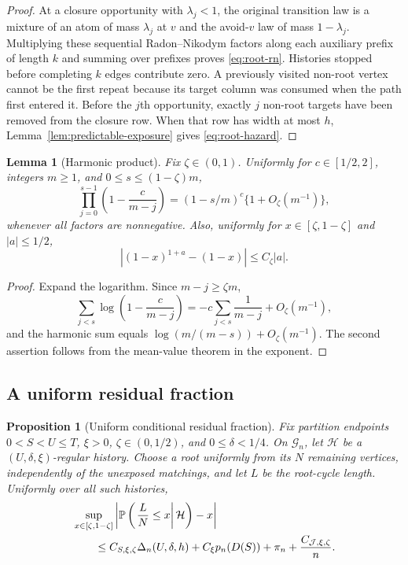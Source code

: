 \documentclass[11pt]{article}
\newtheorem{proposition}[theorem]{Proposition}
\newtheorem{lemma}[theorem]{Lemma}
\theoremstyle{definition}
\theoremstyle{remark}
\newcommand{\Pp}{\mathbb P}
\newcommand{\cH}{\mathcal H}
\newcommand{\cG}{\mathcal G}
\newcommand{\cJ}{\mathcal J}
\begin{document}
\begin{proof}
At a closure opportunity with $\lambda_j<1$, the original transition law is a
mixture of an atom of mass $\lambda_j$ at $v$ and the avoid-$v$ law of mass
$1-\lambda_j$.  Multiplying these sequential Radon--Nikodym factors along
each auxiliary prefix of length $k$ and summing over prefixes proves
\eqref{eq:root-rn}.  Histories stopped before completing $k$ edges contribute
zero.  A previously visited non-root vertex cannot be the first repeat because
its target column was consumed when the path first entered it.  Before the
$j$th opportunity, exactly $j$ non-root targets have been removed from the
closure row.  When that row has width at most $h$,
Lemma~\ref{lem:predictable-exposure} gives \eqref{eq:root-hazard}.
\end{proof}

\begin{lemma}[Harmonic product]
\label{lem:harmonic-product}
Fix $\zeta\in(0,1)$.  Uniformly for $c\in[1/2,2]$, integers $m\ge1$, and
$0\le s\le(1-\zeta)m$,
\begin{equation}
 \prod_{j=0}^{s-1}\left(1-\frac c{m-j}\right)
 =(1-s/m)^c\{1+O_\zeta(m^{-1})\},
 \label{eq:harmonic-product}
\end{equation}
whenever all factors are nonnegative.  Also, uniformly for
$x\in[\zeta,1-\zeta]$ and $|a|\le1/2$,
\[
 |(1-x)^{1+a}-(1-x)|\le C_\zeta|a|.
\]
\end{lemma}

\begin{proof}
Expand the logarithm.  Since $m-j\ge\zeta m$,
\[
 \sum_{j<s}\log\left(1-\frac c{m-j}\right)
 =-c\sum_{j<s}\frac1{m-j}+O_\zeta(m^{-1}),
\]
and the harmonic sum equals
$\log(m/(m-s))+O_\zeta(m^{-1})$.  The second assertion follows from the
mean-value theorem in the exponent.
\end{proof}

\subsection{A uniform residual fraction}

\begin{proposition}[Uniform conditional residual fraction]
\label{prop:uniform-root-fraction}
Fix partition endpoints $0<S<U\le T$, $\xi>0$,
$\zeta\in(0,1/2)$, and $0\le\delta<1/4$.  On $\cG_n$, let $\cH$ be a
$(U,\delta,\xi)$-regular history.  Choose a root uniformly from its $N$
remaining vertices, independently of the unexposed matchings, and let $L$ be
the root-cycle length.  Uniformly over all such histories,
\begin{align}
 &\sup_{x\in[\zeta,1-\zeta]}
 \left|\Pp\left(\left.\frac LN\le x\right|\cH\right)-x\right|
 \notag\\
 &\qquad\le
 C_{S,\xi,\zeta}\Delta_n(U,\delta,h)
 +C_\xi p_n(D(S))+\pi_n+\frac{C_{\cJ,\xi,\zeta}}n.
 \label{eq:root-cdf}
\end{align}
\end{proposition}
\end{document}
